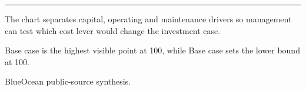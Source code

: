 \documentclass[10pt,a4paper]{article}
\begin{document}
\vspace{3pt}\noindent\begin{minipage}[t]{0.58\linewidth}
\textcolor{BOGreen}{\rule{24mm}{0.6pt}}\par\vspace{3pt}
{\footnotesize\color{BOText} The chart separates capital, operating and maintenance drivers so management can test which cost lever would change the investment case.}\par\vspace{2pt}
{\footnotesize\color{BOText} Base case is the highest visible point at 100, while Base case sets the lower bound at 100.}\par\vspace{2pt}
\end{minipage}\hfill\begin{minipage}[t]{0.36\linewidth}
\par
\end{minipage}\par\vspace{2pt}
\par
{\scriptsize\color{BOMuted} BlueOcean public-source synthesis.}\par
\end{document}
